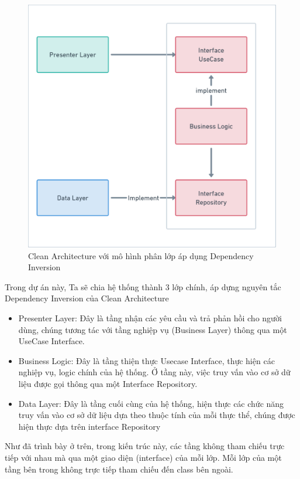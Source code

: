 \begin{figure}[h]
    \centering
    \includegraphics[scale = 0.3]{img/design/clean.png}
    \vspace{1cm}
    \caption{Clean Architecture với mô hình phân lớp áp dụng Dependency Inversion}
    \label{fig:taskAssignment}
\end{figure}
\noindent
Trong dự án này, Ta sẽ chia hệ thống thành 3 lớp chính, áp dựng nguyên tắc Dependency Inversion của Clean Architecture 
\begin{itemize}
    \item Presenter Layer: Đây là tầng nhận các yêu cầu và trả phản hồi cho người dùng, chúng tương tác với tầng nghiệp vụ (Business Layer) thông qua một UseCase Interface.
    \item Business Logic: Đây là tầng thiện thực Usecase Interface, thực hiện các nghiệp vụ, logic chính của hệ thống. Ở tầng này, việc truy vấn vào cơ sở dữ liệu được gọi thông qua một Interface Repository.
    \item Data Layer: Đây là tầng cuối cùng của hệ thống, hiện thực các chức năng truy vấn vào cơ sở dữ liệu dựa theo thuộc tính của mỗi thực thể, chúng được hiện thực dựa trên interface Repository
\end{itemize}
Như đã trình bày ở trên, trong kiến trúc này, các tầng không tham chiếu trực tiếp với nhau mà qua một giao diện (interface) của mỗi lớp. Mỗi lớp của một tầng bên trong không trực tiếp tham chiếu đến class bên ngoài.
\newpage
